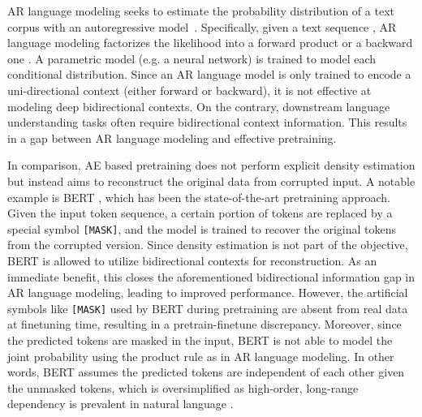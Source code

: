 \documentclass{article}
\begin{document}
AR language modeling seeks to estimate the probability distribution of a text corpus with an autoregressive model~\cite{dai2015semi,peters2018deep,radford2018improving}.
Specifically, given a text sequence , AR language modeling factorizes the likelihood into a forward product  or a backward one .
A parametric model (e.g. a neural network) is trained to model each conditional distribution.
Since an AR language model is only trained to encode a uni-directional context (either forward or backward), it is not effective at modeling deep bidirectional contexts.
On the contrary, downstream language understanding tasks often require bidirectional context information. This results in a gap between AR language modeling and effective pretraining.

In comparison, AE based pretraining does not perform explicit density estimation but instead aims to reconstruct the original data from corrupted input.
A notable example is BERT \cite{devlin2018bert}, which has been the state-of-the-art pretraining approach.
Given the input token sequence, a certain portion of tokens are replaced by a special symbol \texttt{[MASK]}, and the model is trained to recover the original tokens from the corrupted version.
Since density estimation is not part of the objective, BERT is allowed to utilize bidirectional contexts for reconstruction.
As an immediate benefit, this closes the aforementioned bidirectional information gap in AR language modeling, leading to improved performance.
However, the artificial symbols like \texttt{[MASK]} used by BERT during pretraining are absent from real data at finetuning time, resulting in a pretrain-finetune discrepancy.
Moreover, since the predicted tokens are masked in the input, BERT is not able to model the joint probability using the product rule as in AR language modeling. In other words, BERT assumes the predicted tokens are independent of each other given the unmasked tokens, which is oversimplified as high-order, long-range dependency is prevalent in natural language \cite{dai2019transformer}.
\end{document}
